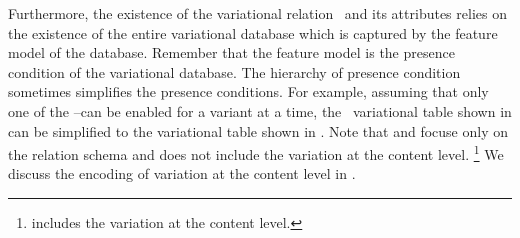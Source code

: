 Furthermore, the existence of the variational relation \empbio\ and its attributes 
relies on the existence of the entire variational database which is captured by
the feature model of the database. Remember that the feature model is the
presence condition of the variational database. 
%
The hierarchy of presence condition sometimes simplifies the presence conditions.
For example, assuming that only one of the \vThree--\vFive can be enabled for a variant at a time, 
the \empbio\ variational table shown in  can be simplified to the 
variational table shown in . 
%
%
Note that  and  focuse 
only on the relation schema and does not 
include the variation at the content level.%
\footnote{ includes
the variation at the content level.} 
We discuss the encoding of variation at the content level in .
%




